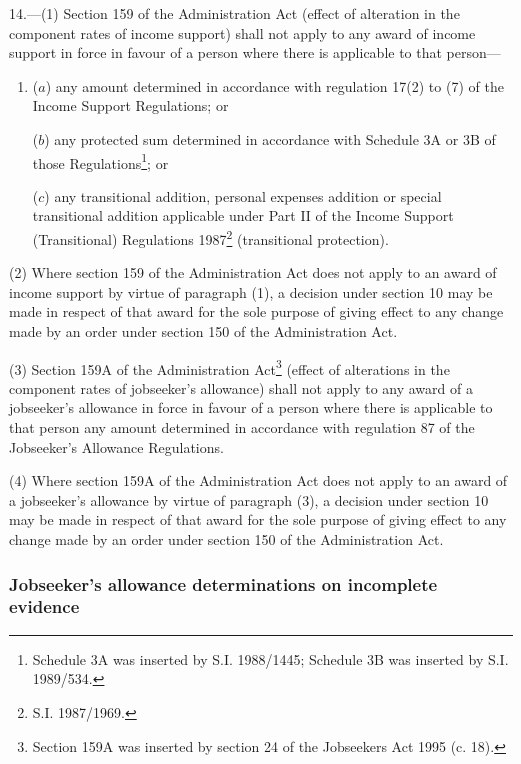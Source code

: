\documentclass[12pt,a4paper]{article}
\begin{document}
14.—(1) Section 159 of the Administration Act (effect of alteration in the component rates of income support) shall not apply to any award of income support in force in favour of a person where there is applicable to that person—
\begin{enumerate}\item[]
($a$) any amount determined in accordance with regulation 17(2) to (7) of the Income Support Regulations; or

($b$) any protected sum determined in accordance with Schedule 3A or 3B of those Regulations\footnote{\frenchspacing Schedule 3A was inserted by S.I. 1988/1445; Schedule 3B was inserted by S.I. 1989/534.}; or

($c$) any transitional addition, personal expenses addition or special transitional addition applicable under Part II of the Income Support (Transitional) Regulations 1987\footnote{\frenchspacing S.I. 1987/1969.} (transitional protection).
\end{enumerate}

(2) Where section 159 of the Administration Act does not apply to an award of income support by virtue of paragraph (1), a decision under section 10 may be made in respect of that award for the sole purpose of giving effect to any change made by an order under section 150 of the Administration Act.

(3) Section 159A of the Administration Act\footnote{\frenchspacing Section 159A was inserted by section 24 of the Jobseekers Act 1995 (c. 18).} (effect of alterations in the component rates of jobseeker’s allowance) shall not apply to any award of a jobseeker’s allowance in force in favour of a person where there is applicable to that person any amount determined in accordance with regulation 87 of the Jobseeker’s Allowance Regulations.

(4) Where section 159A of the Administration Act does not apply to an award of a jobseeker’s allowance by virtue of paragraph (3), a decision under section 10 may be made in respect of that award for the sole purpose of giving effect to any change made by an order under section 150 of the Administration Act.

\subsubsection[15. Jobseeker’s allowance determinations on incomplete evidence]{Jobseeker’s allowance determinations on incomplete evidence}
\end{document}
